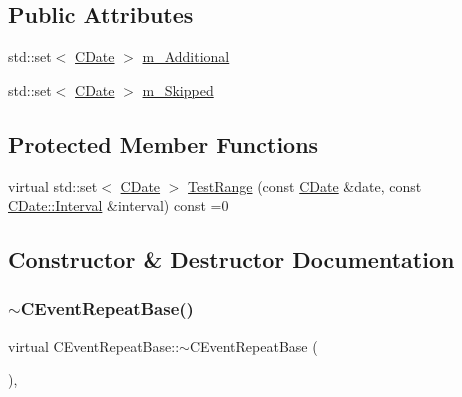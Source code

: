 \subsection*{Public Attributes}
\begin{DoxyCompactItemize}
\item 
std\+::set$<$ \mbox{\hyperlink{class_c_date}{C\+Date}} $>$ \mbox{\hyperlink{class_c_event_repeat_base_a8080eddd346a489c9a04573761895d53}{m\+\_\+\+Additional}}
\item 
std\+::set$<$ \mbox{\hyperlink{class_c_date}{C\+Date}} $>$ \mbox{\hyperlink{class_c_event_repeat_base_a754e059274866f1338e68307894b1602}{m\+\_\+\+Skipped}}
\end{DoxyCompactItemize}
\subsection*{Protected Member Functions}
\begin{DoxyCompactItemize}
\item 
virtual std\+::set$<$ \mbox{\hyperlink{class_c_date}{C\+Date}} $>$ \mbox{\hyperlink{class_c_event_repeat_base_ad8371820b1c9771c93b452e4c80f4cea}{Test\+Range}} (const \mbox{\hyperlink{class_c_date}{C\+Date}} \&date, const \mbox{\hyperlink{class_c_date_af23472c977b14ed341b48183ec19d874}{C\+Date\+::\+Interval}} \&interval) const =0
\end{DoxyCompactItemize}


\subsection{Constructor \& Destructor Documentation}
\mbox{\label{class_c_event_repeat_base_a92978ac3d4425a8d70a0e491fffad471}} 
\subsubsection{\texorpdfstring{$\sim$\+C\+Event\+Repeat\+Base()}{~CEventRepeatBase()}}
{\footnotesize\ttfamily virtual C\+Event\+Repeat\+Base\+::$\sim$\+C\+Event\+Repeat\+Base (\begin{DoxyParamCaption}{ }\end{DoxyParamCaption})\hspace{0.3cm}{\ttfamily [virtual]}, {\ttfamily [default]}}



